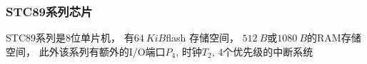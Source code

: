 \documentclass[../main.tex]{subfiles} %
\begin{document}
\subsubsection{STC89系列芯片}

STC89系列是8位单片机，
有$\SI{64}{KiB}$flash 存储空间，
$\SI{512}{B}$或$\SI{1080}{B}$的RAM存储空间，
此外该系列有额外的I/O端口$P_4$,
时钟$T_2$,
4个优先级的中断系统
\end{document}
